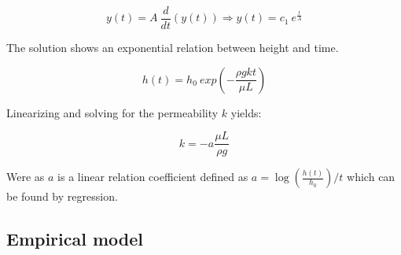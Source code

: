 \begin{equation}
    y(t) = A \: \frac{d}{dt}\left( y(t) \right) \Rightarrow y(t) = c_1 \: e^{\frac{t}{A}}
\end{equation}

The solution shows an exponential relation between height and time.

\begin{equation}\label{diff eq solution}
    h(t) = h_0 \: exp\left(-\frac{\rho g k t}{\mu L}\right)
\end{equation}

Linearizing and solving for the permeability $k$ yields:

\begin{equation}\label{lin.diff sol}
    k = -a\frac{\mu L}{\rho g}
\end{equation}

Were as $a$ is a linear relation coefficient defined as $a = \log\left(\frac{h(t)}{h_0}\right) /t$ which can be found by regression.

\subsection{Empirical model}




